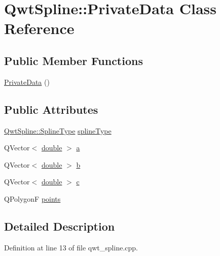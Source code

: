 \hypertarget{class_qwt_spline_1_1_private_data}{\section{Qwt\-Spline\-:\-:Private\-Data Class Reference}
\label{class_qwt_spline_1_1_private_data}
}
\subsection*{Public Member Functions}
\begin{DoxyCompactItemize}
\item 
\hyperlink{class_qwt_spline_1_1_private_data_a878f60e91de1529f354c2e30ff428798}{Private\-Data} ()
\end{DoxyCompactItemize}
\subsection*{Public Attributes}
\begin{DoxyCompactItemize}
\item 
\hyperlink{class_qwt_spline_a2bd2bda128f82acd596348eb8d64231c}{Qwt\-Spline\-::\-Spline\-Type} \hyperlink{class_qwt_spline_1_1_private_data_aae35237eac6ce6dad3acfe93fa7d15d4}{spline\-Type}
\item 
Q\-Vector$<$ \hyperlink{_super_l_u_support_8h_a8956b2b9f49bf918deed98379d159ca7}{double} $>$ \hyperlink{class_qwt_spline_1_1_private_data_a95af1e8554557c9b2238a10ba08446bd}{a}
\item 
Q\-Vector$<$ \hyperlink{_super_l_u_support_8h_a8956b2b9f49bf918deed98379d159ca7}{double} $>$ \hyperlink{class_qwt_spline_1_1_private_data_a9542e0c271a002032c5ad557894165fd}{b}
\item 
Q\-Vector$<$ \hyperlink{_super_l_u_support_8h_a8956b2b9f49bf918deed98379d159ca7}{double} $>$ \hyperlink{class_qwt_spline_1_1_private_data_a3eb918fff20a5ef98ce4195b8df90e6a}{c}
\item 
Q\-Polygon\-F \hyperlink{class_qwt_spline_1_1_private_data_ad8e64ad74ccca016c7d8d39a3c7c1411}{points}
\end{DoxyCompactItemize}


\subsection{Detailed Description}


Definition at line 13 of file qwt\-\_\-spline.\-cpp.



